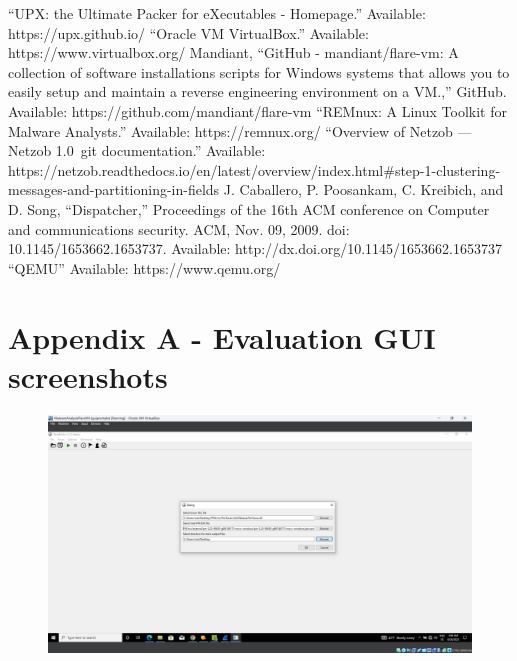 \documentclass[conference]{IEEEtran}
\begin{document}
\begin{thebibliography}{00}
     “UPX: the Ultimate Packer for eXecutables - Homepage.” Available: https://upx.github.io/
     “Oracle VM VirtualBox.” Available: https://www.virtualbox.org/
     Mandiant, “GitHub - mandiant/flare-vm: A collection of software installations scripts for Windows systems that allows you to easily setup and maintain a reverse engineering environment on a VM.,” GitHub. Available: https://github.com/mandiant/flare-vm
     “REMnux: A Linux Toolkit for Malware Analysts.” Available: https://remnux.org/
     “Overview of Netzob — Netzob 1.0~git documentation.” Available: https://netzob.readthedocs.io/en/latest/overview/index.html\#step-1-clustering-messages-and-partitioning-in-fields
     J. Caballero, P. Poosankam, C. Kreibich, and D. Song, “Dispatcher,” Proceedings of the 16th ACM conference on Computer and communications security. ACM, Nov. 09, 2009. doi: 10.1145/1653662.1653737. Available: http://dx.doi.org/10.1145/1653662.1653737
     “QEMU” Available: https://www.qemu.org/

\end{thebibliography}
\vspace{12pt}

\newpage
\section*{Appendix A - Evaluation GUI screenshots}\label{appendix_eval_screenshots}

\begin{figure}
    \centerline{\includegraphics[width=\textwidth]{images/sch_s1.png}}
    \caption{}
    \label{figure:ap_sch_s1}
\end{figure}
\end{document}
